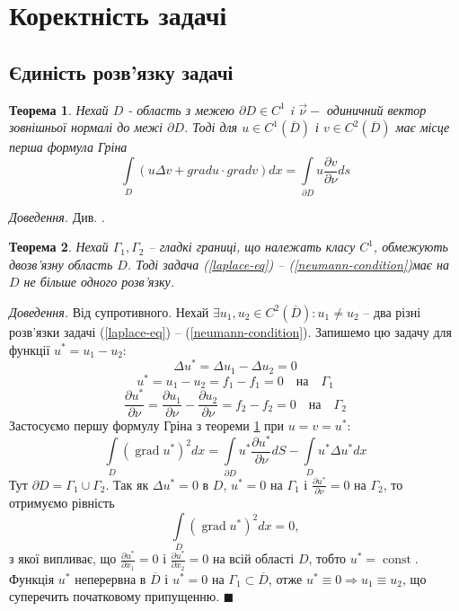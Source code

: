 \documentclass[14pt,a4paper]{extarticle}
\newcounter{e}
\newtheorem{theorem}{Теорема}[section]
\newcommand{\proof}{\textit{Доведення. \space}}
\numberwithin{equation}{section}
\newcommand{\intl}{\int\limits}
\begin{document}
\newcommand{\boundprob}{(\ref{laplace-eq}) -- (\ref{neumann-condition})} 
	
	
 \newpage
 \thispagestyle{empty}
 \section{Коректність задачі}
 \subsection{Єдиність розв'язку задачі}
 \begin{theorem}
 \label{green}
 Нехай $D$ - область з межею $\partial D \in C^1$ i $\overrightarrow{\nu} -$ одиничний вектор зовнішньої нормалі до межі $\partial D$. Тоді для $u \in C^1(\overline{D})$ і $v \in C^2(\overline{D})$ має місце перша формула Гріна
 $$
 \intl_{D}(u \Delta v+grad u \cdot grad v) d x=\intl_{\partial D} u \frac{\partial v}{\partial \nu} d s
 $$
\end{theorem}
\proof Див. \cite{kress2012linear}.
  
\begin{theorem}
	\label{single-sol}
	Нехай $\Gamma_{1}, \Gamma_{2}$ -- гладкі границі, що належать класу $C^1$, обмежують двозв'язну область $D$. Тоді задача \boundprob \space має на $D$ не більше одного розв'язку.
\end{theorem}
 
 \proof Від супротивного. Нехай $\exists u_1, u_2 \in C^{2}(\overline{D}): u_1 \neq u_2 $ -- два різні розв'язки задачі \boundprob. Запишемо цю задачу для функції $u^* = u_1 - u_2$:
 $$
 \Delta u^* = \Delta u_1 - \Delta u_2 = 0
 $$
 $$
 u^* = u_1 - u_2 = f_1 - f_1 = 0 \quad \text{на} \quad \Gamma_1
 $$
 $$
 \frac{\partial u^*}{\partial \nu}
 = \frac{\partial u_1}{\partial \nu} - \frac{\partial u_2}{\partial \nu}
 = f_2 - f_2 = 0 \quad \text{на} \quad \Gamma_2
 $$
 Застосуємо першу формулу Гріна з теореми \ref{green} при $u = v = u^*$:
 $$
 \intl_{D}(\operatorname{grad} u^*)^2 dx
 = \intl_{\partial D} u^* \frac{\partial u^*}{\partial \nu} dS
 - \intl_{D} u^* \Delta u^* dx
 $$
 Тут $\partial D = \Gamma_1 \cup \Gamma_2$. Так як $\Delta u^* = 0 $ в $D$, $u^*=0$ на $\Gamma_1$ і $\frac{\partial u^*}{\partial \nu} = 0$ на $\Gamma_2$, то отримуємо рівність
 $$
 \intl_{D}(\operatorname{grad} u^*)^2 dx = 0,
 $$
 з якої випливає, що $\frac{\partial u^*}{\partial x_1} = 0$ і $\frac{\partial u^*}{\partial x_2} = 0$ на всій області $D$, тобто $u^* = \operatorname{const}$. Функція $u^*$ неперервна в $\overline{D}$ і $u^*=0$ на $\Gamma_1 \subset \overline{D}$, отже $u^*\equiv0 \Rightarrow u_1\equiv u_2$, що суперечить початковому припущенню. $\blacksquare$
 
\end{document}

